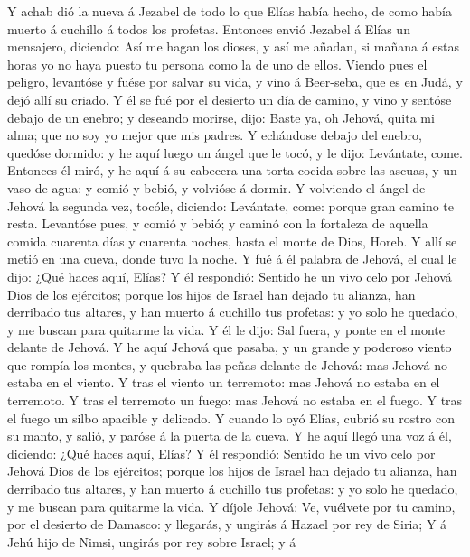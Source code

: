  Y achab dió la nueva á Jezabel de todo lo que Elías había
hecho, de como había muerto á cuchillo á todos los profetas.
 Entonces envió Jezabel á Elías un mensajero, diciendo: Así
me hagan los dioses, y así me añadan, si mañana á estas horas yo no haya
puesto tu persona como la de uno de ellos.  Viendo pues el
peligro, levantóse y fuése por salvar su vida, y vino á Beer-seba, que
es en Judá, y dejó allí su criado.  Y él se fué por el
desierto un día de camino, y vino y sentóse debajo de un enebro; y
deseando morirse, dijo: Baste ya, oh Jehová, quita mi alma; que no soy
yo mejor que mis padres.  Y echándose debajo del enebro,
quedóse dormido: y he aquí luego un ángel que le tocó, y le dijo:
Levántate, come.  Entonces él miró, y he aquí á su cabecera
una torta cocida sobre las ascuas, y un vaso de agua: y comió y bebió, y
volvióse á dormir.  Y volviendo el ángel de Jehová la
segunda vez, tocóle, diciendo: Levántate, come: porque gran camino te
resta.  Levantóse pues, y comió y bebió; y caminó con la
fortaleza de aquella comida cuarenta días y cuarenta noches, hasta el
monte de Dios, Horeb.  Y allí se metió en una cueva, donde
tuvo la noche. Y fué á él palabra de Jehová, el cual le dijo: ¿Qué haces
aquí, Elías?  Y él respondió: Sentido he un vivo celo por
Jehová Dios de los ejércitos; porque los hijos de Israel han dejado tu
alianza, han derribado tus altares, y han muerto á cuchillo tus
profetas: y yo solo he quedado, y me buscan para quitarme la vida.
 Y él le dijo: Sal fuera, y ponte en el monte delante de
Jehová. Y he aquí Jehová que pasaba, y un grande y poderoso viento que
rompía los montes, y quebraba las peñas delante de Jehová: mas Jehová no
estaba en el viento. Y tras el viento un terremoto: mas Jehová no estaba
en el terremoto.  Y tras el terremoto un fuego: mas Jehová
no estaba en el fuego. Y tras el fuego un silbo apacible y delicado.
 Y cuando lo oyó Elías, cubrió su rostro con su manto, y
salió, y paróse á la puerta de la cueva. Y he aquí llegó una voz á él,
diciendo: ¿Qué haces aquí, Elías?  Y él respondió: Sentido
he un vivo celo por Jehová Dios de los ejércitos; porque los hijos de
Israel han dejado tu alianza, han derribado tus altares, y han muerto á
cuchillo tus profetas: y yo solo he quedado, y me buscan para quitarme
la vida.  Y díjole Jehová: Ve, vuélvete por tu camino, por
el desierto de Damasco: y llegarás, y ungirás á Hazael por rey de Siria;
 Y á Jehú hijo de Nimsi, ungirás por rey sobre Israel; y á
